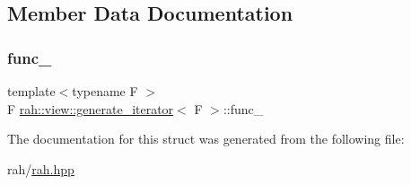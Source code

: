 \subsection{Member Data Documentation}
\mbox{\label{structrah_1_1view_1_1generate__iterator_a72f19774c5fddd0a04a293bd08dce1cd}} 
\subsubsection{\texorpdfstring{func\_}{func\_}}
{\footnotesize\ttfamily template$<$typename F $>$ \\
F \mbox{\hyperlink{structrah_1_1view_1_1generate__iterator}{rah\+::view\+::generate\+\_\+iterator}}$<$ F $>$\+::func\+\_\+\hspace{0.3cm}{\ttfamily [mutable]}}



The documentation for this struct was generated from the following file\+:\begin{DoxyCompactItemize}
\item 
rah/\mbox{\hyperlink{rah_8hpp}{rah.\+hpp}}\end{DoxyCompactItemize}
